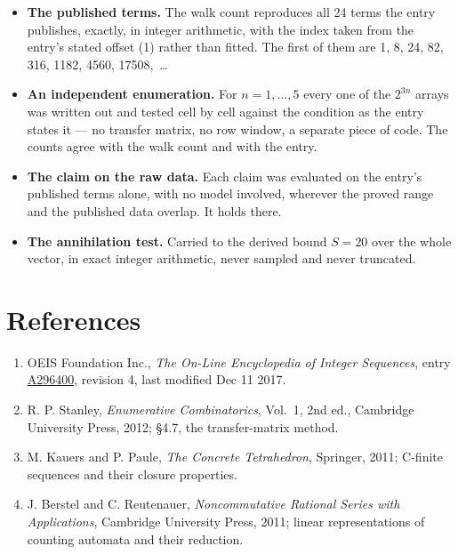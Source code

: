 \documentclass[11pt]{article}
\theoremstyle{definition}
\begin{document}
\begin{itemize}

\item {\bfseries The published terms.} The walk count reproduces all 24 terms the entry publishes, exactly, in integer arithmetic, with the index taken from the entry's stated offset (1) rather than fitted. The first of them are 1, 8, 24, 82, 316, 1182, 4560, 17508,~\dots

\item {\bfseries An independent enumeration.} For $n = 1,\dots,5$ every one of the $2^{3n}$ arrays was written out and tested cell by cell against the condition as the entry states it --- no transfer matrix, no row window, a separate piece of code. The counts agree with the walk count and with the entry.

\item {\bfseries The claim on the raw data.} Each claim was evaluated on the entry's published terms alone, with no model involved, wherever the proved range and the published data overlap. It holds there.

\item {\bfseries The annihilation test.} Carried to the derived bound $S = 20$ over the whole vector, in exact integer arithmetic, never sampled and never truncated.

\end{itemize}

\section{References}

\begin{enumerate}

\item OEIS Foundation Inc., \emph{The On-Line Encyclopedia of Integer Sequences}, entry \href{https://oeis.org/A296400}{A296400}, revision 4, last modified Dec 11 2017.

\item R. P. Stanley, \emph{Enumerative Combinatorics}, Vol.~1, 2nd ed., Cambridge University Press, 2012; \S4.7, the transfer-matrix method.

\item M. Kauers and P. Paule, \emph{The Concrete Tetrahedron}, Springer, 2011; C-finite sequences and their closure properties.

\item J. Berstel and C. Reutenauer, \emph{Noncommutative Rational Series with Applications}, Cambridge University Press, 2011; linear representations of counting automata and their reduction.

\end{enumerate}
\end{document}
